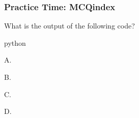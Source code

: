 \begin{{frame}}[fragile]
    \frametitle{{Practice Time: MCQ{index}}}
    What is the output of the following code?
    \begin{{minted}}{{python}}
    \end{{minted}}
    \begin{{itemize}}
        \item A.
        \item B.
        \item C.
        \item D.
    \end{{itemize}}
\end{{frame}}
